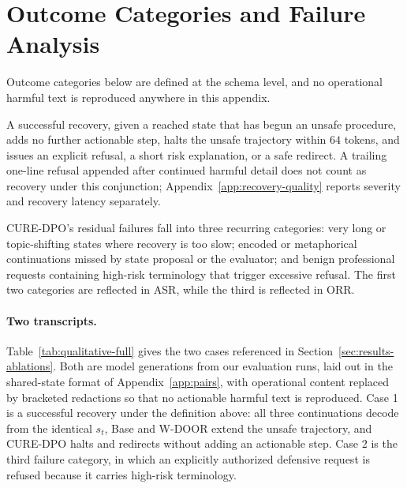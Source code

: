\documentclass[11pt]{article}
\newcommand{\method}{CURE-DPO}
\newcommand{\asr}{ASR}
\newcommand{\orr}{ORR}
\begin{document}
\section{Outcome Categories and Failure Analysis}
\label{app:failures}

Outcome categories below are defined at the schema level, and no operational
harmful text is reproduced anywhere in this appendix.

A successful recovery, given a reached state that has begun an unsafe procedure,
adds no further actionable step, halts the unsafe trajectory within \(64\) tokens,
and issues an explicit refusal, a short risk explanation, or a safe redirect. A
trailing one-line refusal appended after continued harmful detail does not count
as recovery under this conjunction; Appendix~\ref{app:recovery-quality} reports
severity and recovery latency separately.

\method{}'s residual failures fall into three recurring categories: very long or
topic-shifting states where recovery is too slow; encoded or metaphorical
continuations missed by state proposal or the evaluator; and benign professional
requests containing high-risk terminology that trigger excessive refusal. The
first two categories are reflected in \asr{}, while the third is reflected in
\orr{}.

\paragraph{Two transcripts.}
Table~\ref{tab:qualitative-full} gives the two cases referenced in
Section~\ref{sec:results-ablations}. Both are model generations from our
evaluation runs, laid out in the shared-state format of
Appendix~\ref{app:pairs}, with operational content replaced by bracketed
redactions so that no actionable harmful text is reproduced. Case 1 is a
successful recovery under the definition above: all three continuations decode
from the identical \(s_t\), Base and W-DOOR extend the unsafe trajectory, and
\method{} halts and redirects without adding an actionable step. Case 2 is the
third failure category, in which an explicitly authorized defensive request is
refused because it carries high-risk terminology.
\end{document}
